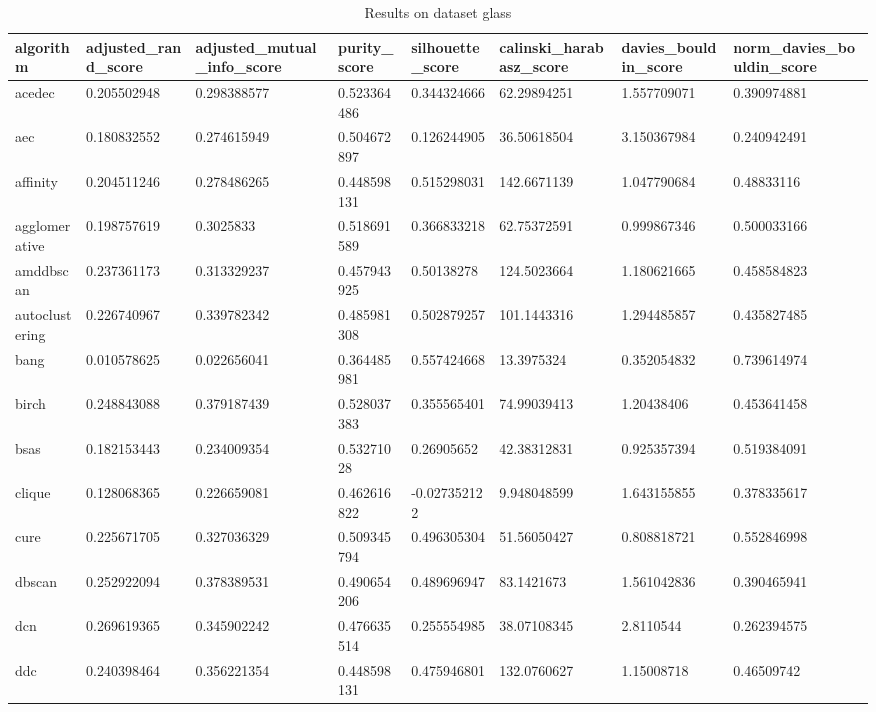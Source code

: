 \clearpage

\begin{table}[H]
\centering
\caption{Results on dataset glass}
\label{S63_Table}
\begin{tabular}{|l|l|l|l|l|l|l|l|}
\hline
algorithm & adjusted\_rand\_score & adjusted\_mutual\_info\_score & purity\_score & silhouette\_score & calinski\_harabasz\_score & davies\_bouldin\_score & norm\_davies\_bouldin\_score \\
\hline
acedec & 0.205502948 & 0.298388577 & 0.523364486 & 0.344324666 & 62.29894251 & 1.557709071 & 0.390974881 \\
\hline
aec & 0.180832552 & 0.274615949 & 0.504672897 & 0.126244905 & 36.50618504 & 3.150367984 & 0.240942491 \\
\hline
affinity & 0.204511246 & 0.278486265 & 0.448598131 & 0.515298031 & 142.6671139 & 1.047790684 & 0.48833116 \\
\hline
agglomerative & 0.198757619 & 0.3025833 & 0.518691589 & 0.366833218 & 62.75372591 & 0.999867346 & 0.500033166 \\
\hline
amddbscan & 0.237361173 & 0.313329237 & 0.457943925 & 0.50138278 & 124.5023664 & 1.180621665 & 0.458584823 \\
\hline
autoclustering & 0.226740967 & 0.339782342 & 0.485981308 & 0.502879257 & 101.1443316 & 1.294485857 & 0.435827485 \\
\hline
bang & 0.010578625 & 0.022656041 & 0.364485981 & 0.557424668 & 13.3975324 & 0.352054832 & 0.739614974 \\
\hline
birch & 0.248843088 & 0.379187439 & 0.528037383 & 0.355565401 & 74.99039413 & 1.20438406 & 0.453641458 \\
\hline
bsas & 0.182153443 & 0.234009354 & 0.53271028 & 0.26905652 & 42.38312831 & 0.925357394 & 0.519384091 \\
\hline
clique & 0.128068365 & 0.226659081 & 0.462616822 & -0.027352122 & 9.948048599 & 1.643155855 & 0.378335617 \\
\hline
cure & 0.225671705 & 0.327036329 & 0.509345794 & 0.496305304 & 51.56050427 & 0.808818721 & 0.552846998 \\
\hline
dbscan & 0.252922094 & 0.378389531 & 0.490654206 & 0.489696947 & 83.1421673 & 1.561042836 & 0.390465941 \\
\hline
dcn & 0.269619365 & 0.345902242 & 0.476635514 & 0.255554985 & 38.07108345 & 2.8110544 & 0.262394575 \\
\hline
ddc & 0.240398464 & 0.356221354 & 0.448598131 & 0.475946801 & 132.0760627 & 1.15008718 & 0.46509742 \\

\end{tabular}
\end{table}
